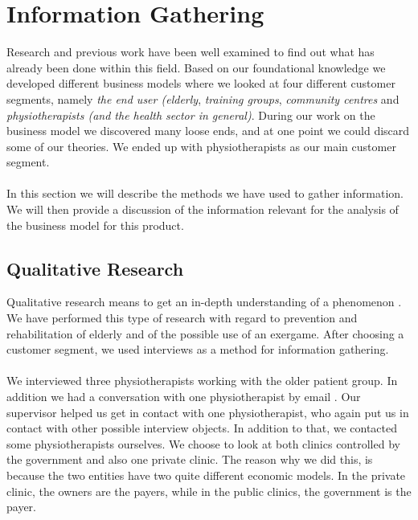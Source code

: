 \chapter{Information Gathering}

Research and previous work have been well examined to find out what has already been done within this field. Based on our foundational knowledge we developed different business models where we looked at four different customer segments, namely \emph{the end user (elderly}, \emph{training groups}, \emph{community centres} and \emph{physiotherapists (and the health sector in general)}. During our work on the business model we discovered many loose ends, and at one point we could discard some of our theories. We ended up with physiotherapists as our main customer segment.\\ \\
In this section we will describe the methods we have used to gather information. We will then provide a discussion of the information relevant for the analysis of the business model for this product. 

\section{Qualitative Research}
Qualitative research means to get an in-depth understanding of a phenomenon \cite{interview2}. We have performed this type of research with regard to prevention and rehabilitation of elderly and of the possible use of an exergame. After choosing a customer segment, we used interviews as a method for information gathering.  \\ \\
We interviewed three physiotherapists working with the older patient group. In addition we had a conversation with one physiotherapist by email . Our supervisor helped us get in contact with one physiotherapist, who again put us in contact with other possible interview objects. In addition to that, we contacted some physiotherapists ourselves. We choose to look at both clinics controlled by the government and also one private clinic. The reason why we did this, is because the two entities have two quite different economic models. In the private clinic, the owners are the payers, while in the public clinics, the government is the payer.

